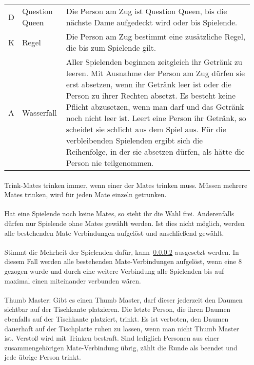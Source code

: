 \begin{tabular}{p{1em} p{4em} p{23em}}
	D  & Question Queen & Die Person am Zug ist Question Queen, bis die nächste Dame aufgedeckt wird oder bis Spielende.                                                       \\[1ex]
	K  & Regel          & Die Person am Zug bestimmt eine zusätzliche Regel, die bis zum Spielende gilt.                                                                       \\[1ex]
	A  & Wasserfall     & Aller Spielenden beginnen zeitgleich ihr Getränk zu leeren.
	Mit Ausnahme der Person am Zug dürfen sie erst absetzen, wenn ihr Getränk leer ist oder die Person zu ihrer Rechten absetzt.
	Es besteht keine Pflicht abzusetzen, wenn man darf und das Getränk noch nicht leer ist.
	Leert eine Person ihr Getränk, so scheidet sie schlicht aus dem Spiel aus.
	Für die verbleibenden Spielenden ergibt sich die Reihenfolge, in der sie absetzen dürfen, als hätte die Person nie teilgenommen.                                           \\[1ex]
\end{tabular}

\paragraph{}
Trink-Mates trinken immer, wenn einer der Mates trinken muss.
Müssen mehrere Mates trinken, wird für jeden Mate einzeln getrunken.

\paragraph{}\label{Ring_of_Fire:Mates}
Hat eine Spielende noch keine Mates, so steht ihr die Wahl frei.
Anderenfalls dürfen nur Spielende ohne Mates gewählt werden.
Ist dies nicht möglich, werden alle bestehenden Mate-Verbindungen aufgelöst und anschließend gewählt.

\paragraph{}
Stimmt die Mehrheit der Spielenden dafür, kann~\ref{Ring_of_Fire:Mates} ausgesetzt werden.
In diesem Fall werden alle bestehenden Mate-Verbindungen aufgelöst, wenn eine 8 gezogen wurde und durch eine weitere Verbindung alle Spielenden bis auf maximal einen miteinander verbunden wären.

\paragraph{}
Thumb Master: Gibt es einen Thumb Master, darf dieser jederzeit den Daumen sichtbar auf der Tischkante platzieren.
Die letzte Person, die ihren Daumen ebenfalls auf der Tischkante platziert, trinkt.
Es ist verboten, den Daumen dauerhaft auf der Tischplatte ruhen zu lassen, wenn man nicht Thumb Master ist.
Verstoß wird mit Trinken bestraft.
Sind lediglich Personen aus einer zusammengehörigen Mate-Verbindung übrig, zählt die Runde als beendet und jede übrige Person trinkt.

